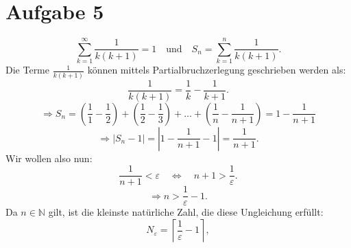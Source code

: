 \section{Aufgabe 5}
\[
\sum_{k=1}^\infty \frac{1}{k(k+1)} = 1 \quad \text{und} \quad S_n = \sum_{k=1}^n \frac{1}{k(k+1)}.
\]
Die Terme \(\frac{1}{k(k+1)}\) können mittels Partialbruchzerlegung geschrieben werden als:
\[
\frac{1}{k(k+1)} = \frac{1}{k} - \frac{1}{k+1}.
\]
\[
\Rightarrow S_n = \left( \frac{1}{1} - \frac{1}{2} \right) + \left( \frac{1}{2} - \frac{1}{3} \right) + \dots + \left( \frac{1}{n} - \frac{1}{n+1} \right) = 1 - \frac{1}{n+1}
\]
\[
\Rightarrow |S_n - 1| = \left| 1 - \frac{1}{n+1} - 1 \right| = \frac{1}{n+1}.
\]
Wir wollen also nun: 
\[
\frac{1}{n+1} < \varepsilon \quad \Leftrightarrow \quad n+1 > \frac{1}{\varepsilon}.
\]
\[
\Rightarrow n > \frac{1}{\varepsilon} - 1.
\]
Da \(n \in \mathbb{N}\) gilt, ist die kleinste natürliche Zahl, die diese Ungleichung erfüllt:
\[
N_\varepsilon = \left\lceil \frac{1}{\varepsilon} - 1 \right\rceil,
\]